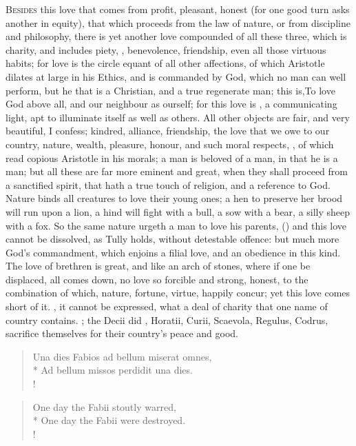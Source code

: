 {\lettrine{B}{esides} this love that comes from profit, pleasant, honest (for one
good turn asks another in equity), that which proceeds from the law of
nature, or from discipline and philosophy, there is yet another love
compounded of all these three, which is charity, and includes piety,
, benevolence, friendship, even all those virtuous habits; for
love is the circle equant of all other affections, of which Aristotle
dilates at large in his Ethics, and is commanded by God, which no man
can well perform, but he that is a Christian, and a true regenerate
man; this is,To love God above all, and our neighbour as ourself;
for this love is , a communicating light,
apt to illuminate itself as well as others. All other objects are fair,
and very beautiful, I confess; kindred, alliance, friendship, the love
that we owe to our country, nature, wealth, pleasure, honour, and such
moral respects, \etc{}, of which read copious Aristotle in his
morals; a man is beloved of a man, in that he is a man; but all these
are far more eminent and great, when they shall proceed from a
sanctified spirit, that hath a true touch of religion, and a reference
to God. Nature binds all creatures to love their young ones; a hen to
preserve her brood will run upon a lion, a hind will fight with a bull,
a sow with a bear, a silly sheep with a fox. So the same nature urgeth
a man to love his parents, () and this love cannot be dissolved, as
Tully holds, without detestable offence: but much more God's
commandment, which enjoins a filial love, and an obedience in this
kind. The love of brethren is great, and like an arch of stones,
where if one be displaced, all comes down, no love so forcible and
strong, honest, to the combination of which, nature, fortune, virtue,
happily concur; yet this love comes short of it. , it cannot be expressed, what a deal of charity
that one name of country contains. ; the Decii did , Horatii, Curii, Scaevola, Regulus,
Codrus, sacrifice themselves for their country's peace and good.
%
\begin{latin}
\begin{verse}
Una dies Fabios ad bellum miserat omnes,\\*
Ad bellum missos perdidit una dies.\\!
\end{verse}
\end{latin}
\translationrule
\begin{verse}
One day the Fabii stoutly warred,\\*
One day the Fabii were destroyed.\\!
\end{verse}

}
